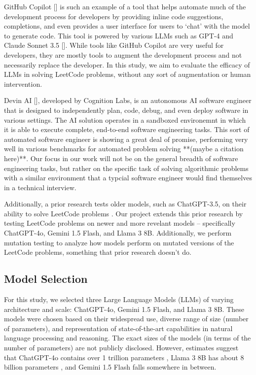 \documentclass[times, 10pt,twocolumn]{article}
\begin{document}
GitHub Copilot [] is such an example of a tool that helps automate much of the development process for developers by providing inline code suggestions, completions, and even provides a user interface for users to `chat' with the model to generate code. This tool is powered by various LLMs such as GPT-4 and Claude Sonnet 3.5 []. While tools like GitHub Copilot are very useful for developers, they are mostly tools to augment the development process and not necessarily replace the developer. In this study, we aim to evaluate the efficacy of LLMs in solving LeetCode problems, without any sort of augmentation or human intervention.

Devin AI [], developed by Cognition Labs, is an autonomous AI software engineer that is designed to independently plan, code, debug, and even deploy software in various settings. The AI solution operates in a sandboxed environemnt in which it is able to execute complete, end-to-end software engineering tasks. This sort of automated software engineer is showing a great deal of promise, performing very well in various benchmarks for automated problem solving **(maybe a citation here)**. Our focus in our work will not be on the general breadth of software engineering tasks, but rather on the specific task of solving algorithmic problems with a similar environment that a typcial software engineer would find themselves in a technical interview. 

Additionally, a prior research tests older models, such as ChatGPT-3.5, on their ability to solve LeetCode problems \cite{li2024evaluatingchatgpt35efficiencysolving}. Our project extends this prior research by testing LeetCode problems on newer and more revelant models -- specifically ChatGPT-4o, Gemini 1.5 Flash, and Llama 3 8B. Additionally, we perform mutation testing to analyze how models perform on mutated versions of the LeetCode problems, something that prior research doesn't do.


\subsection{Model Selection}

For this study, we selected three Large Language Models (LLMs) of varying architecture and scale: ChatGPT-4o, Gemini 1.5 Flash, and Llama 3 8B. These models were chosen based on their widespread use, diverse range of size (number of parameters), and representation of state-of-the-art capabilities in natural language processing and reasoning. The exact sizes of the models (in terms of the number of parameters) are not publicly disclosed. However, estimates suggest that ChatGPT-4o contains over 1 trillion parameters \cite{Lacy_2024}, Llama 3 8B has about 8 billion parameters \cite{AIatMeta_2024}, and Gemini 1.5 Flash falls somewhere in between.
\end{document}

